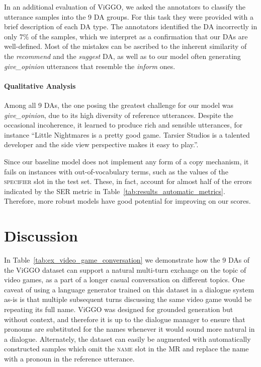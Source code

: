 \documentclass[11pt,a4paper]{article}
\begin{document}
In an additional evaluation of ViGGO, we asked the annotators to classify the utterance samples into the 9 DA groups. For this task they were provided with a brief description of each DA type. The annotators identified the DA incorrectly in only 7\% of the samples, which we interpret as a confirmation that our DAs are well-defined. Most of the mistakes can be ascribed to the inherent similarity of the \emph{recommend} and the \emph{suggest} DA, as well as to our model often generating \emph{give\_opinion} utterances that resemble the \emph{inform} ones.

\paragraph{Qualitative Analysis}
Among all 9 DAs, the one posing the greatest challenge for our model was \emph{give\_opinion}, due to its high diversity of reference utterances. Despite the occasional incoherence, it learned to produce rich and sensible utterances, for instance ``Little Nightmares is a pretty good game. Tarsier Studios is a talented developer and the side view perspective makes it easy to play.''.


Since our baseline model does not implement any form of a copy mechanism, it fails on instances with out-of-vocabulary terms, such as the values of the \textsc{specifier} slot in the test set. These, in fact, account for almost half of the errors indicated by the SER metric in Table~\ref{tab:results_automatic_metrics}. Therefore, more robust models have good potential for improving on our scores.



\section{Discussion}


In Table~\ref{tab:ex_video_game_conversation} we demonstrate how the 9 DAs of the ViGGO dataset can support a natural multi-turn exchange on the topic of video games, as a part of a longer casual conversation on different topics. One caveat of using a language generator trained on this dataset in a dialogue system as-is is that multiple subsequent turns discussing the same video game would be repeating its full name. ViGGO was designed for grounded generation but without context, and therefore it is up to the dialogue manager to ensure that pronouns are substituted for the names whenever it would sound more natural in a dialogue. Alternately, the dataset can easily be augmented with automatically constructed samples which omit the \textsc{name} slot in the MR and replace the name with a pronoun in the reference utterance.
\end{document}
